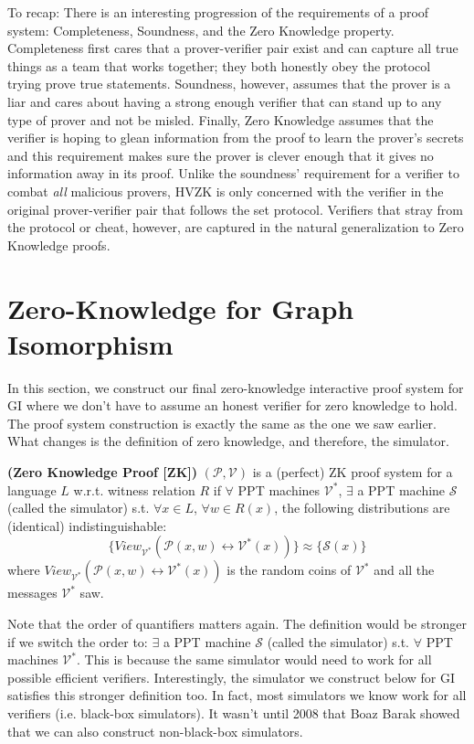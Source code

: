 To recap: There is an interesting progression of the requirements of a proof system: Completeness, Soundness, and the Zero Knowledge property.  Completeness first cares that a prover-verifier pair exist and can capture all true things as a team that works together; they both honestly obey the protocol trying prove true statements.  Soundness, however, assumes that the prover is a liar and cares about having a strong enough verifier that can stand up to any type of prover and not be misled.  Finally, Zero Knowledge assumes that the verifier is hoping to glean information from the proof to learn the prover's secrets and this requirement makes sure the prover is clever enough that it gives no information away in its proof. Unlike the soundness' requirement for a verifier to combat \textit{all} malicious provers, HVZK is only concerned with the verifier in the original prover-verifier pair that follows the set protocol. Verifiers that stray from the protocol or cheat, however, are captured in the natural generalization to Zero Knowledge proofs.

\section{Zero-Knowledge for Graph Isomorphism}

In this section, we construct our final zero-knowledge interactive proof system for GI where we don't have to assume an honest verifier for zero knowledge to hold. The proof system construction is exactly the same as the one we saw earlier. What changes is the definition of zero knowledge, and therefore, the simulator. 

\begin{definition} {\normalfont\textbf{(Zero Knowledge Proof [ZK])}} 
	$(\mathcal{P},\mathcal{V})$ is a (perfect) ZK proof system for a language $L$ w.r.t. witness relation $R$ if $\forall$ PPT machines $\mathcal{V}^*$,
	$\exists$ a PPT machine $\mathcal{S}$ (called the simulator) s.t. $\forall x \in L$, $\forall w\in R(x)$, the following distributions are (identical) indistinguishable:
$$\{View_{\mathcal{V^*}}(\mathcal{P}(x,w) \leftrightarrow \mathcal{V^*}(x))\} \approx \{\mathcal{S}(x)\}$$
where $View_{\mathcal{V^*}}(\mathcal{P}(x,w) \leftrightarrow \mathcal{V^*}(x))$ is the random coins of $\mathcal{V^*}$ and all the messages $\mathcal{V^*}$ saw.
\end{definition}
\begin{remark}
	Note that the order of quantifiers matters again. The definition would be stronger if we switch the order to: $\exists$ a PPT machine $\mathcal{S}$ (called the simulator) s.t. $\forall$ PPT machines $\mathcal{V}^*$. This is because the same simulator would need to work for all possible efficient verifiers. Interestingly, the simulator we construct below for GI satisfies this stronger definition too. In fact, most simulators we know work for all verifiers (i.e. black-box simulators). It wasn't until 2008 that Boaz Barak showed that we can also construct non-black-box simulators. 
\end{remark}

